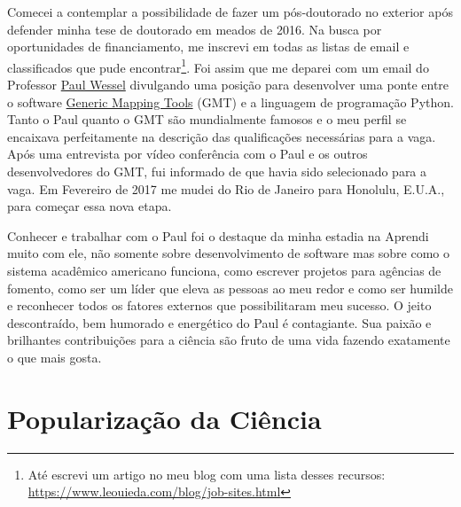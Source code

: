 \documentclass[10pt,a4paper,oneside]{book}
\begin{document}
Comecei a contemplar a possibilidade de fazer um pós-doutorado no exterior
após defender minha tese de doutorado em meados de 2016.
Na busca por oportunidades de financiamento, me inscrevi em todas as listas de
email e classificados que pude encontrar\footnote{Até escrevi um artigo no
meu blog com uma lista desses recursos:
\url{https://www.leouieda.com/blog/job-sites.html}}.
Foi assim que me deparei com um email do Professor
\href{https://www.soest.hawaii.edu/pwessel/}{Paul Wessel} divulgando uma
posição para desenvolver uma ponte entre o software
\href{https://www.generic-mapping-tools.org/}{Generic Mapping Tools} (GMT)
e a linguagem de programação Python.
Tanto o Paul quanto o GMT são mundialmente famosos e o meu perfil se encaixava
perfeitamente na descrição das qualificações necessárias para a vaga.
Após uma entrevista por vídeo conferência com o Paul e os outros
desenvolvedores do GMT, fui informado de que havia sido selecionado para a
vaga.
Em Fevereiro de 2017 me mudei do Rio de Janeiro para Honolulu, E.U.A., para
começar essa nova etapa.

Conhecer e trabalhar com o Paul foi o destaque da minha estadia na
Aprendi muito com ele, não somente sobre desenvolvimento de software mas sobre
como o sistema acadêmico americano funciona, como escrever projetos para
agências de fomento, como ser um líder que eleva as pessoas ao meu redor e como
ser humilde e reconhecer todos os fatores externos que possibilitaram meu
sucesso.
O jeito descontraído, bem humorado e energético do Paul é contagiante.
Sua paixão e brilhantes contribuições para a ciência são fruto de uma vida
fazendo exatamente o que mais gosta.

\section{Popularização da Ciência}
\label{sec_comunidade}
\end{document}
